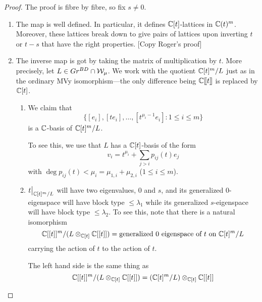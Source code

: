 \documentclass{article}
\begin{document}
\begin{proof}
    The proof is fibre by fibre, so fix $s\ne 0$. 
    \begin{enumerate}
        \item The map is well defined. In particular, it defines $\mathbb C[t]$-lattices in $\mathbb C(t)^m$. Moreover, these lattices break down to give pairs of lattices upon inverting $t$ or $t-s$ that have the right properties. [Copy Roger's proof]
        \item The inverse map is got by taking the matrix of multiplication by $t$.  More precisely, let $ L \in Gr^{BD} \cap \mathcal W_\mu$.  We work with the quotient $\mathbb C[t]^m/L$ just as in the ordinary MVy isomorphism---the only difference being $\mathbb C[\hspace{-.12em}[ {t} ]\hspace{-.12em}]$ is replaced by $\mathbb C[t]$.
\begin{enumerate}
    \item 
    We claim that 
    \begin{equation}
        \{[e_i],[te_i],\dots,[t^{\mu_{i}-1}e_i] : 1\le i \le m\}
    \end{equation}
    is a $\mathbb C$-basis of $\mathbb C[t]^m/L$.
    
    To see this, we use that $ L $ 
 has a $\mathbb C[t]$-basis of the form 
    \begin{equation}
        v_i = t^{\mu_i} + \sum_{j>i} p_{ij}(t) e_j 
    \end{equation}
    with $\deg p_{ij}(t) < \mu_i = \mu_{1,i} + \mu_{2,i}$ ($1\le i\le m$).
    \item $t\big|_{\mathbb C[t]^m/L}$ will have two eigenvalues, 0 and $s$, and its generalized 0-eigenspace will have block type $\le \lambda_1$ while its generalized $s$-eigenspace will have block type $\le \lambda_2$. 
    To see this, note that there is a natural isomorphism
    $$\mathbb C[[t]]^m/(L \otimes_{\mathbb C[t]} \mathbb C[[t]]) = \text{generalized $0$ eigenspace of $t$ on } \mathbb C[t]^m/L$$
    carrying the action of $t $ to the action of $t$.
    
    The left hand side is the same thing as
    $$ \mathbb C[[t]]^m / (L \otimes_{\mathbb C[t]} \mathbb C[[t]]) = (\mathbb C[t]^m/L) \otimes_{\mathbb C[t]} \mathbb C[[t]] $$
    

\end{enumerate}
\end{enumerate}
\end{proof}
\end{document}
